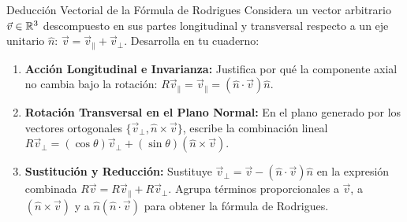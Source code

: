 \documentclass[10pt,aspectratio=169]{beamer}
\begin{document}
\begin{frame}{Deducción Vectorial de la Fórmula de Rodrigues}
  \vspace{0.05cm}
  Considera un vector arbitrario $\vec{v} \in \mathbb{R}^3$ descompuesto en sus partes longitudinal y transversal respecto a un eje unitario $\hat{n}$: $\vec{v} = \vec{v}_\parallel + \vec{v}_\perp$. Desarrolla en tu cuaderno:
  \vspace{0.22cm}
  \begin{enumerate}\itemsep10pt
    \item[(a)] \textbf{Acción Longitudinal e Invarianza:} Justifica por qué la componente axial no cambia bajo la rotación: $R\vec{v}_\parallel = \vec{v}_\parallel = (\hat{n}\cdot\vec{v})\hat{n}$.
    \item[(b)] \textbf{Rotación Transversal en el Plano Normal:} En el plano generado por los vectores ortogonales $\{\vec{v}_\perp, \hat{n}\times\vec{v}\}$, escribe la combinación lineal $R\vec{v}_\perp = (\cos\theta)\vec{v}_\perp + (\sin\theta)(\hat{n}\times\vec{v})$.
    \item[(c)] \textbf{Sustitución y Reducción:} Sustituye $\vec{v}_\perp = \vec{v} - (\hat{n}\cdot\vec{v})\hat{n}$ en la expresión combinada $R\vec{v} = R\vec{v}_\parallel + R\vec{v}_\perp$. Agrupa términos proporcionales a $\vec{v}$, a $(\hat{n}\times\vec{v})$ y a $\hat{n}(\hat{n}\cdot\vec{v})$ para obtener la fórmula de Rodrigues.
  \end{enumerate}
\end{frame}
\end{document}
